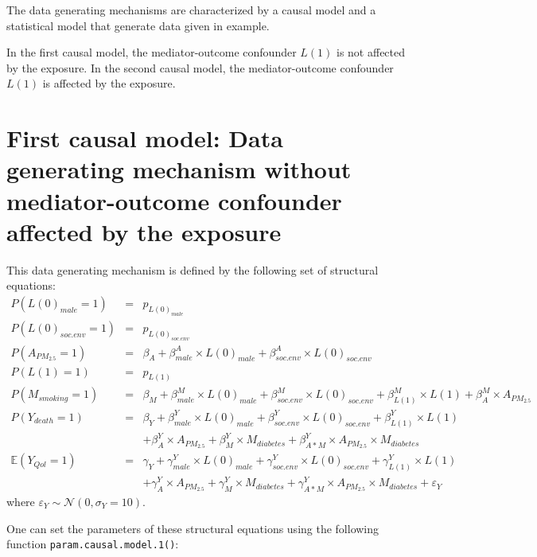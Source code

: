 \documentclass[
]{book}
\begin{document}
The data generating mechanisms are characterized by a causal model and a statistical model that generate data given in example.

In the first causal model, the mediator-outcome confounder \(L(1)\) is not affected by the exposure. In the second causal model, the mediator-outcome confounder \(L(1)\) is affected by the exposure.

\section{First causal model: Data generating mechanism without mediator-outcome confounder affected by the exposure}\label{first-causal-model-data-generating-mechanism-without-mediator-outcome-confounder-affected-by-the-exposure}

This data generating mechanism is defined by the following set of structural equations:
\[\begin{array}{lll}
P(L(0)_{male} = 1) &=& p_{L(0)_{male}}\\
P(L(0)_{soc.env} = 1) &=& p_{L(0)_{soc.env}}\\
P(A_{PM_{2.5}} = 1) &=& \beta_{A} + \beta_{male}^A \times L(0)_{male} + \beta_{soc.env}^A \times L(0)_{soc.env}\\
P(L(1) = 1) &=& p_{L(1)}\\
P(M_{smoking} = 1) &=& \beta_{M} + \beta_{male}^M \times L(0)_{male} + \beta_{soc.env}^M \times L(0)_{soc.env} + \beta_{L(1)}^M \times L(1) + \beta_{A}^M \times A_{PM_{2.5}}\\
P(Y_{death} = 1) &=& \beta_{Y} + \beta_{male}^Y \times L(0)_{male} + \beta_{soc.env}^Y \times L(0)_{soc.env} + \beta_{L(1)}^Y \times L(1)\\
                 & & + \beta_{A}^Y \times A_{PM_{2.5}} + \beta_{M}^Y \times M_{diabetes} + \beta_{A \ast M }^Y \times A_{PM_{2.5}} \times M_{diabetes}\\
\mathbb{E}(Y_{Qol} = 1) &=& \gamma_{Y} + \gamma_{male}^Y \times L(0)_{male} + \gamma_{soc.env}^Y \times L(0)_{soc.env} + \gamma_{L(1)}^Y \times L(1)\\
                 & &+ \gamma_{A}^Y \times A_{PM_{2.5}} + \gamma_{M}^Y \times M_{diabetes} + \gamma_{A \ast M }^Y \times A_{PM_{2.5}} \times M_{diabetes} + \varepsilon_Y
\end{array}\]
where \(\varepsilon_Y \sim \mathcal{N}(0,\sigma_Y = 10)\).

One can set the parameters of these structural equations using the following function \texttt{param.causal.model.1()}:
\end{document}
